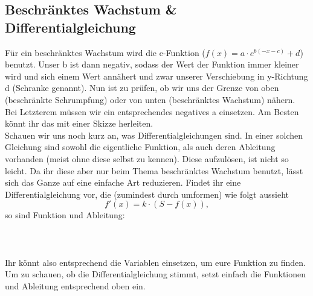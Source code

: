 \subsection{Beschränktes Wachstum \& Differentialgleichung}
	Für ein beschränktes Wachstum wird die e-Funktion (\(f(x)=a\cdot
	e^{b(-x-c)}+d\)) benutzt. Unser b ist dann negativ, sodass der Wert der
	Funktion immer kleiner wird und sich einem Wert annähert und zwar unserer
	Verschiebung in y-Richtung d (Schranke genannt). Nun ist zu prüfen, ob wir uns
	der Grenze von oben (beschränkte Schrumpfung) oder von unten (beschränktes
	Wachstum) nähern. Bei Letzterem müssen wir ein entsprechendes negatives a
	einsetzen. Am Besten könnt ihr das mit einer Skizze herleiten.\\
	Schauen wir uns noch kurz an, was Differentialgleichungen sind. In einer
	solchen Gleichung sind sowohl die eigentliche Funktion, als auch deren
	Ableitung vorhanden (meist ohne diese selbst zu kennen). Diese aufzulösen, ist
	nicht so leicht. Da ihr diese aber nur beim Thema beschränktes Wachstum
	benutzt, lässt sich das Ganze auf eine einfache Art reduzieren. Findet ihr
	eine Differentialgleichung vor, die (zumindest durch umformen) wie folgt
	aussieht
	\[f'(x)=k\cdot (S-f(x)),\]
	so sind Funktion und Ableitung:
	\\ \\
	\formel{\[f(x)=S+a\cdot e^{-kx},\ f'(x)=-ake^{-kx}\]}
	\\ \\
	Ihr könnt also entsprechend die Variablen einsetzen, um eure Funktion zu
	finden. Um zu schauen, ob die Differentialgleichung stimmt, setzt einfach die
	Funktionen und Ableitung entsprechend oben ein.
